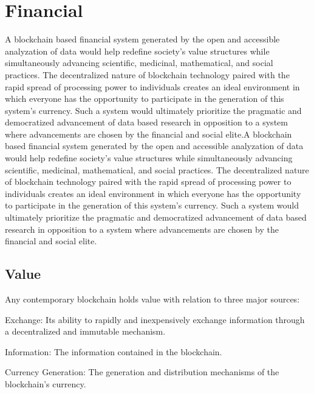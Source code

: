 \section{Financial}

\label{sec:finance}

A blockchain based financial system generated by the open and accessible analyzation of data would help redefine society’s value structures while simultaneously advancing scientific, medicinal, mathematical, and social practices.  The decentralized nature of blockchain technology paired with the rapid spread of processing power to individuals creates an ideal environment in which everyone has the opportunity to participate in the generation of this system’s currency.  Such a system would ultimately prioritize the pragmatic and democratized advancement of data based research in opposition to a system where advancements are chosen by the financial and social elite.A blockchain based financial system generated by the open and accessible analyzation of data would help redefine society’s value structures while simultaneously advancing scientific, medicinal, mathematical, and social practices.  The decentralized nature of blockchain technology paired with the rapid spread of processing power to individuals creates an ideal environment in which everyone has the opportunity to participate in the generation of this system’s currency.  Such a system would ultimately prioritize the pragmatic and democratized advancement of data based research in opposition to a system where advancements are chosen by the financial and social elite.

\subsection{Value}

Any contemporary blockchain holds value with relation to three major sources: \\

\begin{compactenum}
	\item Exchange: Its ability to rapidly and inexpensively exchange information through a decentralized and immutable mechanism.  \\
	\item Information: The information contained in the blockchain. \\
	\item Currency Generation: The generation and distribution mechanisms of the blockchain’s currency. \\
\end{compactenum}

